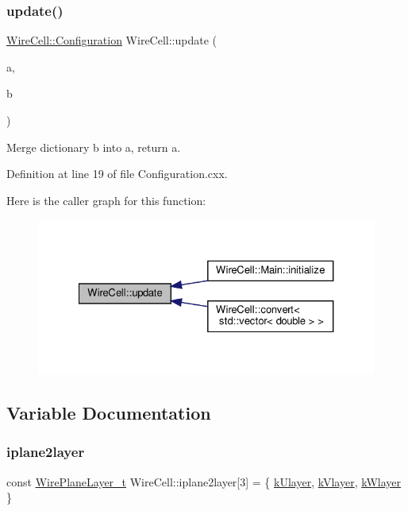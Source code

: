 \subsubsection{\texorpdfstring{update()}{update()}}
{\footnotesize\ttfamily \hyperlink{namespace_wire_cell_a9f705541fc1d46c608b3d32c182333ee}{Wire\+Cell\+::\+Configuration} Wire\+Cell\+::update (\begin{DoxyParamCaption}\item[{\hyperlink{namespace_wire_cell_a9f705541fc1d46c608b3d32c182333ee}{Wire\+Cell\+::\+Configuration} \&}]{a,  }\item[{\hyperlink{namespace_wire_cell_a9f705541fc1d46c608b3d32c182333ee}{Wire\+Cell\+::\+Configuration} \&}]{b }\end{DoxyParamCaption})}



Merge dictionary b into a, return a. 



Definition at line 19 of file Configuration.\+cxx.

Here is the caller graph for this function\+:
\nopagebreak
\begin{figure}[H]
\begin{center}
\leavevmode
\includegraphics[width=327pt]{namespace_wire_cell_a5d4ad22423a3c77cc4f57d3a7aa95f49_icgraph}
\end{center}
\end{figure}


\subsection{Variable Documentation}
\mbox{\label{namespace_wire_cell_ae1f5243cecaaeeea6ddd0b5ac75719df}} 
\subsubsection{\texorpdfstring{iplane2layer}{iplane2layer}}
{\footnotesize\ttfamily const \hyperlink{namespace_wire_cell_a761397ff086f0a7e1a1d9ccd251ac618}{Wire\+Plane\+Layer\+\_\+t} Wire\+Cell\+::iplane2layer\mbox{[}3\mbox{]} = \{ \hyperlink{namespace_wire_cell_a761397ff086f0a7e1a1d9ccd251ac618a4543784e91b7463d50a413e9eaea3229}{k\+Ulayer}, \hyperlink{namespace_wire_cell_a761397ff086f0a7e1a1d9ccd251ac618ad767a06a96af29d2fd31cbf13f4a1c86}{k\+Vlayer}, \hyperlink{namespace_wire_cell_a761397ff086f0a7e1a1d9ccd251ac618ac96acb93802a30ef1648ee1c0e81eab1}{k\+Wlayer} \}}



